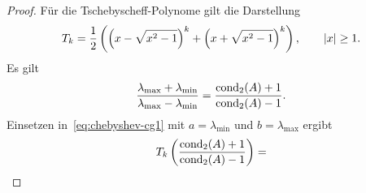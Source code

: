 \begin{proof}
  Für die Tschebyscheff-Polynome gilt die Darstellung
  \begin{gather}
    T_k = \frac12
    \left(
      \left(x-\sqrt{x^2-1}\right)^k
      +
      \left(x+\sqrt{x^2-1}\right)^k
    \right),\qquad\lvert x\rvert\ge 1.
  \end{gather}
  Es gilt
  \begin{gather}
    \frac{\lambda_{\max}+\lambda_{\min}}{\lambda_{\max}-\lambda_{\min}}
    = \frac{\operatorname{cond}_2(A)+1}{\operatorname{cond}_2(A)-1}.
  \end{gather}
  Einsetzen in~\eqref{eq:chebyshev-cg1} mit $a=\lambda_{\min}$ und $b=\lambda_{\max}$ ergibt
  \begin{gather}
    T_k\left(\frac{\operatorname{cond}_2(A)+1}{\operatorname{cond}_2(A)-1}\right)
    = 
  \end{gather}
\end{proof}


